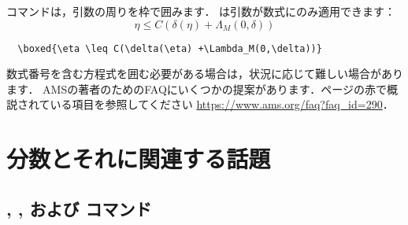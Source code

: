 コマンドは，引数の周りを枠で囲みます．
は引数が数式にのみ適用できます：
\begin{equation}
\boxed{\eta \leq C(\delta(\eta) +\Lambda_M(0,\delta))}
\end{equation}
\begin{verbatim}
  \boxed{\eta \leq C(\delta(\eta) +\Lambda_M(0,\delta))}
\end{verbatim}
数式番号を含む方程式を囲む必要がある場合は，状況に応じて難しい場合があります．
AMSの著者のためのFAQにいくつかの提案があります．ページの赤で概説されている項目を参照してください
\url{https://www.ams.org/faq?faq_id=290}．



\section{分数とそれに関連する話題}

\subsection{, , および
  コマンド}
  
